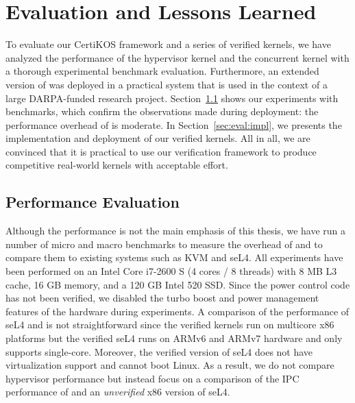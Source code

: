 
\chapter{Evaluation and Lessons Learned}
\label{chap-eval}
To evaluate
our CertiKOS framework
and a series of verified kernels,
we have analyzed the performance of the \mCTOShyper{} hypervisor kernel and the  \cCTOS{} concurrent kernel
with a thorough experimental benchmark evaluation.
Furthermore, an extended version of \mCTOShyper{}
was deployed in a practical system that is used in the context of a
large DARPA-funded research project. 
Section~\ref{sec:eval:perform} shows our experiments with benchmarks, which
confirm the observations made during deployment: the performance
overhead of \mCTOShyper{} is moderate. 
In Section~\ref{sec:eval:impl},
we presents the implementation and deployment of
our verified kernels.
All in all, we are convinced that it is
practical to use our verification framework to produce competitive
real-world kernels with acceptable effort.


\section{Performance Evaluation} 
\label{sec:eval:perform}
Although the performance is not the main emphasis of this thesis, we
have run a number of micro and macro benchmarks to measure the
overhead of {\mCTOS} and {\cCTOS}
to compare them to existing systems such
as KVM and seL4. All experiments have been performed on an Intel Core
i7-2600 S (4 cores / 8 threads) with 8 MB L3 cache, 16 GB memory, and
a 120 GB Intel 520 SSD. Since the power control code has not been
verified, we disabled the turbo boost and power management features of
the hardware during experiments.
A comparison of the performance of seL4 and \cCTOS{} is not
straightforward since the verified \cCTOS{} kernels run on 
multicore
x86
platforms but the verified seL4 runs on ARMv6
and ARMv7 hardware and only supports single-core. Moreover, the
verified version of seL4 does not have virtualization support and
cannot boot Linux. As a result, we do not compare hypervisor
performance but instead focus on a comparison of the IPC performance
of {\cCTOS} and an \emph{unverified} x86 version of seL4.


